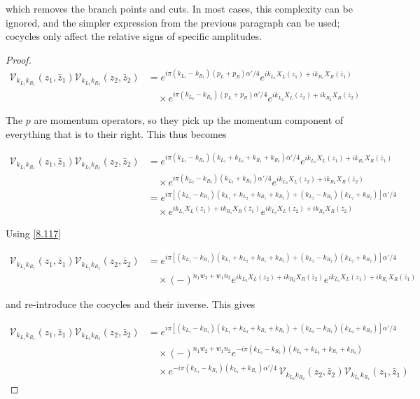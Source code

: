 which removes the branch points and cuts.
In most cases, this complexity can be ignored, and the simpler expression from the previous paragraph can be used; cocycles only affect the relative signs of specific amplitudes.
\begin{tcolorbox}[breakable]
	\begin{proof}
		\begin{align}
			\mathscr{V}_{k_{L_1}k_{R_1}}(z_1,\bar z_1)\mathscr{V}_{k_{L_2}k_{R_2}}(z_2,\bar z_2)
			&= e^{i\pi(k_{L_1}-k_{R_1})(p_L+p_R)\alpha'/4}e^{ik_{L_1}X_L(z_1)+ik_{R_1}X_R(\bar{z}_1)} \nonumber\\
			&\quad \times e^{i\pi(k_{L_2}-k_{R_2})(p_L+p_R)\alpha'/4}e^{ik_{L_2}X_L(z_2)+ik_{R_2}X_R(\bar{z}_2)}\label{8.117}
		\end{align}
		
		The \( p \) are momentum operators, so they pick up the momentum component of everything that is to their right. This thus becomes
		
		\begin{align}
			\mathscr{V}_{k_{L_1}k_{R_1}}(z_1,\bar z_1)\mathscr{V}_{k_{L_2}k_{R_2}}(z_2,\bar z_2)
			&= e^{i\pi(k_{L_1}-k_{R_1})(k_{L_1}+k_{L_2}+k_{R_1}+k_{R_2})\alpha'/4}e^{ik_{L_1}X_L(z_1)+ik_{R_1}X_R(\bar{z}_1)} \nonumber\\
			&\quad \times e^{i\pi(k_{L_2}-k_{R_2})(k_{L_2}+k_{R_2})\alpha'/4}e^{ik_{L_2}X_L(z_2)+ik_{R_2}X_R(\bar{z}_2)} \nonumber\\
			&= e^{i\pi\left[(k_{L_1}-k_{R_1})(k_{L_1}+k_{L_2}+k_{R_1}+k_{R_2})+(k_{L_2}-k_{R_2})(k_{L_2}+k_{R_2})\right]\alpha'/4} \nonumber\\
			&\quad \times e^{ik_{L_1}X_L(z_1)+ik_{R_1}X_R(\bar{z}_1)}e^{ik_{L_2}X_L(z_2)+ik_{R_2}X_R(\bar{z}_2)}
		\end{align}
		
		Using \eqref{8.117}
		
		\begin{align}
			\mathscr{V}_{k_{L_1}k_{R_1}}(z_1,\bar z_1)\mathscr{V}_{k_{L_2}k_{R_2}}(z_2,\bar z_2)
			&= e^{i\pi\left[(k_{L_1}-k_{R_1})(k_{L_1}+k_{L_2}+k_{R_1}+k_{R_2})+(k_{L_2}-k_{R_2})(k_{L_2}+k_{R_2})\right]\alpha'/4} \nonumber\\
			&\quad \times (-)^{n_1w_2+w_1n_2}e^{ik_{L_2}X_L(z_2)+ik_{R_2}X_R(\bar{z}_2)}e^{ik_{L_1}X_L(z_1)+ik_{R_1}X_R(\bar{z}_1)} 
		\end{align}
		
		and re-introduce the cocycles and their inverse. This gives
		
		\begin{align}
			\mathscr{V}_{k_{L_1}k_{R_1}}(z_1,\bar z_1)\mathscr{V}_{k_{L_2}k_{R_2}}(z_2,\bar z_2)
			&= e^{i\pi\left[(k_{L_1}-k_{R_1})(k_{L_1}+k_{L_2}+k_{R_1}+k_{R_2})+(k_{L_2}-k_{R_2})(k_{L_2}+k_{R_2})\right]\alpha'/4} \nonumber\\
			&\quad \times (-)^{n_1w_2+w_1n_2}e^{-i\pi(k_{L_2}-k_{R_2})(k_{L_1}+k_{L_2}+k_{R_1}+k_{R_2})} \nonumber\\
			&\quad \times e^{-i\pi(k_{L_1}-k_{R_1})(k_{L_1}+k_{R_1})\alpha'/4}\,
			\mathscr{V}_{k_{L_2}k_{R_2}}(z_2,\bar z_2)\mathscr{V}_{k_{L_1}k_{R_1}}(z_1,\bar z_1) 
		\end{align}
		

\end{proof}
\end{tcolorbox}
